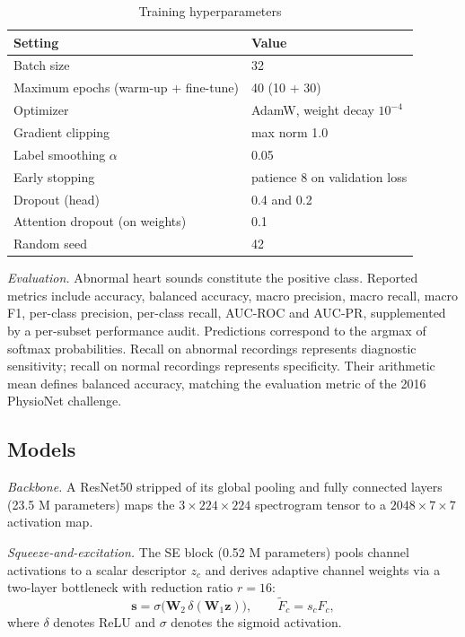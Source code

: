 \documentclass[conference]{IEEEtran}
\begin{document}
\begin{table}[t]
\caption{Training hyperparameters}
\label{tab:hp}
\centering
\footnotesize
\begin{tabular}{ll}
\toprule
Setting & Value \\
\midrule
Batch size & 32 \\
Maximum epochs (warm-up + fine-tune) & 40 (10 + 30) \\
Optimizer & AdamW, weight decay $10^{-4}$ \\
Gradient clipping & max norm 1.0 \\
Label smoothing $\alpha$ & 0.05 \\
Early stopping & patience 8 on validation loss \\
Dropout (head) & 0.4 and 0.2 \\
Attention dropout (on weights) & 0.1 \\
Random seed & 42 \\
\bottomrule
\end{tabular}
\end{table}

\textit{Evaluation.} Abnormal heart sounds constitute the positive class. Reported metrics include accuracy, balanced accuracy, macro precision, macro recall, macro F1, per-class precision, per-class recall, AUC-ROC and AUC-PR, supplemented by a per-subset performance audit. Predictions correspond to the argmax of softmax probabilities. Recall on abnormal recordings represents diagnostic sensitivity; recall on normal recordings represents specificity. Their arithmetic mean defines balanced accuracy, matching the evaluation metric of the 2016 PhysioNet challenge.

\subsection{Models}
\textit{Backbone.} A ResNet50 \cite{he} stripped of its global pooling and fully connected layers (23.5 M parameters) maps the $3\times224\times224$ spectrogram tensor to a $2048\times7\times7$ activation map.

\textit{Squeeze-and-excitation.} The SE block \cite{hu} (0.52 M parameters) pools channel activations to a scalar descriptor $z_c$ and derives adaptive channel weights via a two-layer bottleneck with reduction ratio $r=16$:
\begin{equation}
\mathbf{s} = \sigma\!\big(\mathbf{W}_2\,\delta(\mathbf{W}_1\mathbf{z})\big),\qquad \tilde{F}_c = s_c F_c,
\end{equation}
where $\delta$ denotes ReLU and $\sigma$ denotes the sigmoid activation.
\end{document}
